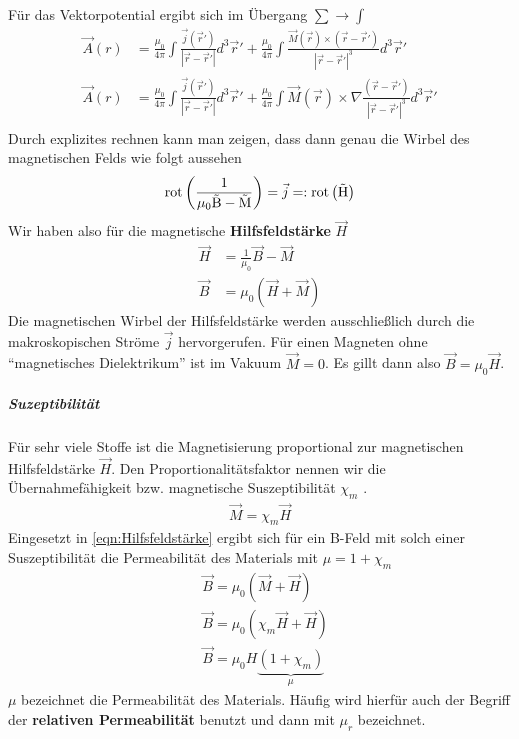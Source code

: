 Für das Vektorpotential ergibt sich im Übergang $\sum \rightarrow \int$
\begin{align*}
\vec{A}(r) &= \frac{\mu_0}{4\pi} \int \frac{\vec{j}(\vec{r}')}{|\vec{r}-\vec{r}'|} d^3 \vec{r}'  + \frac{\mu_0}{4\pi} \int \frac{\vec{M}(\vec{r}) \times \left(    \vec{r}-\vec{r}' \right)}{|\vec{r}-\vec{r}'|^3} d^3 \vec{r}'\\
\vec{A}(r) &= \frac{\mu_0}{4\pi} \int \frac{\vec{j}(\vec{r}')}{|\vec{r}-\vec{r}'|} d^3 \vec{r}'  + \frac{\mu_0}{4\pi} \int \vec{M}(\vec{r}) \times \nabla \frac{ \left(    \vec{r}-\vec{r}' \right)}{|\vec{r}-\vec{r}'|^3} d^3 \vec{r}'\\
\end{align*}
Durch explizites rechnen kann man zeigen, dass dann genau die Wirbel des magnetischen Felds wie folgt aussehen
\begin{align} \label{eqn:HilfsfeldstaerkeRot}
\mathrm{rot\left({\frac{1}{\mu_0 \vec{B} - \vec{M}}}\right)} = \vec{j} =: \mathrm{rot\left({\vec{H}}\right)}
\end{align}
Wir haben also für die magnetische \textbf{Hilfsfeldstärke} $\vec{H}$
\begin{align} \label{eqn:Hilfsfeldstärke}
\vec{H} &= \frac{1}{\mu_0 } \vec{B} - \vec{M} \\
\vec{B}	&= \mu_0 \left( \vec{H} + \vec{M}\right)
\end{align}
Die magnetischen Wirbel der Hilfsfeldstärke werden ausschließlich durch die makroskopischen Ströme $\vec{j}$ hervorgerufen. Für einen Magneten ohne "`magnetisches Dielektrikum"' ist im Vakuum $\vec{M} = 0$. Es gillt dann also $\vec{B} = \mu_0 \vec{H}$.

\subparagraph{Suzeptibilität} Für sehr viele Stoffe ist die Magnetisierung proportional zur magnetischen Hilfsfeldstärke $\vec{H}$. 
Den Proportionalitätsfaktor nennen wir die Übernahmefähigkeit bzw. magnetische Suszeptibilität $\chi_m$ .
\begin{align} \label{eqn:Magnetisierung Hilfsfeld}
\vec{M} = \chi_m \vec{H}
\end{align}Eingesetzt in \ref{eqn:Hilfsfeldstärke} ergibt sich für ein B-Feld mit solch einer Suszeptibilität die Permeabilität des Materials mit $\mu = 1+ \chi_m$
\begin{align} \label{eqn:Permeabilität}
&\vec{B} = \mu_0 \left( \vec{M} + \vec{H} \right)\\
&\vec{B}	= \mu_0 \left( \chi_m \vec{H} + \vec{H} \right)\\
&\boxed{\vec{B}= \mu_0 H \underbrace{\left( 1 + \chi_m \right)}_{\mu}}
\end{align}$\mu$ bezeichnet die Permeabilität des Materials. Häufig wird hierfür auch der Begriff der \textbf{relativen Permeabilität} benutzt und dann mit $\mu_r$ bezeichnet. \par

